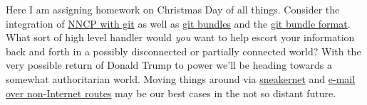 Here I am assigning homework on Christmas Day of all things. Consider
the integration of \href{http://www.nncpgo.org/Git.html}{NNCP with git}
as well as \href{https://www.git-scm.com/docs/git-bundle}{git bundles}
and the \href{https://www.git-scm.com/docs/gitformat-bundle}{git bundle
format}. What sort of high level handler would \emph{you} want to help
escort your information back and forth in a possibly disconnected or
partially connected world? With the very possible return of Donald Trump
to power we'll be heading towards a somewhat authoritarian world. Moving
things around via
\href{https://simple.wikipedia.org/wiki/Sneakernet}{sneakernet} and
\href{https://git-scm.com/docs/git-send-email}{e-mail over non-Internet
routes} may be our best cases in the not so distant future.
